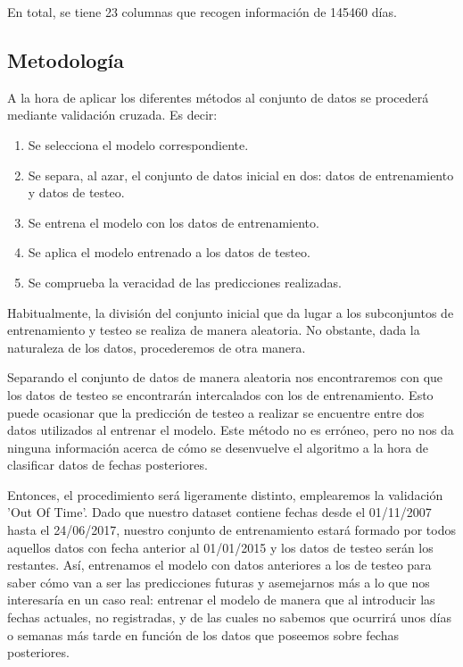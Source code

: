 \documentclass[12pt,twoside]{article}
\begin{document}
En total, se tiene 23 columnas que recogen información de 145460 días.


\subsection{Metodología}

A la hora de aplicar los diferentes métodos al conjunto de datos se procederá mediante validación cruzada. Es decir:

\begin{enumerate}
\item Se selecciona el modelo correspondiente.
\item Se separa, al azar, el conjunto de datos inicial en dos: datos de entrenamiento y datos de testeo.
\item Se entrena el modelo con los datos de entrenamiento.
\item Se aplica el modelo entrenado a los datos de testeo.
\item Se comprueba la veracidad de las predicciones realizadas.
\end{enumerate}

Habitualmente, la división del conjunto inicial que da lugar a los subconjuntos de entrenamiento y testeo se realiza de manera aleatoria. No obstante, dada la naturaleza de los datos, procederemos de otra manera.

Separando el conjunto de datos de manera aleatoria nos encontraremos con que los datos de testeo se encontrarán intercalados con los de entrenamiento. Esto puede ocasionar que la predicción de testeo a realizar se encuentre entre dos datos utilizados al entrenar el modelo. Este método no es erróneo, pero no nos da ninguna información acerca de cómo se desenvuelve el algoritmo a la hora de clasificar datos de fechas posteriores.

Entonces, el procedimiento será ligeramente distinto, emplearemos la validación 'Out Of Time'. Dado que nuestro dataset contiene fechas desde el 01/11/2007 hasta el 24/06/2017, nuestro conjunto de entrenamiento estará formado por todos aquellos datos con fecha anterior al 01/01/2015 y los datos de testeo serán los restantes. Así, entrenamos el modelo con datos anteriores a los de testeo para saber cómo van a ser las predicciones futuras y asemejarnos más a lo que nos interesaría en un caso real: entrenar el modelo de manera que al introducir las fechas actuales, no registradas, y de las cuales no sabemos que ocurrirá unos días o semanas más tarde en función de los datos que poseemos sobre fechas posteriores.
\end{document}
